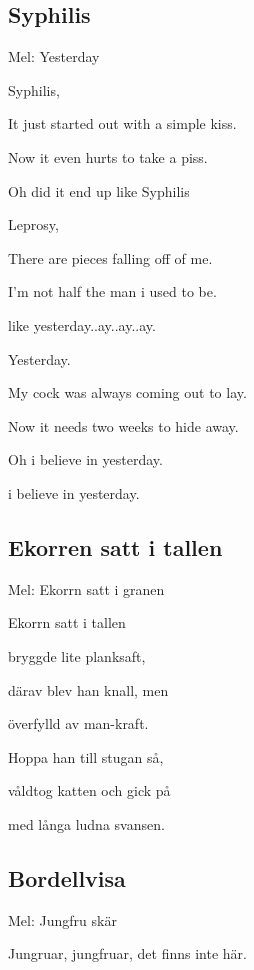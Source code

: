 

\pagestyle{Barnförbjudet}



\subsection{\textbf{Syphilis}}

Mel: Yesterday\bigskip

Syphilis,

It just started out with a simple kiss.

Now it even hurts to take a piss.

Oh did it end up like Syphilis\bigskip

Leprosy,

There are pieces falling off of me.

I'm not half the man i used to be.

like yesterday..ay..ay..ay.\bigskip

Yesterday.

My cock was always coming out to lay.

Now it needs two weeks to hide away.

Oh i believe in yesterday.

i believe in yesterday.

\subsection{\textbf{Ekorren satt i tallen}} 

Mel: Ekorrn satt i granen\bigskip

Ekorrn satt i tallen

bryggde lite planksaft,

därav blev han knall, men

överfylld av man-kraft.

Hoppa han till stugan så, 

våldtog katten och gick på

med långa ludna svansen.

\subsection{\textbf{Bordellvisa}}

Mel: Jungfru skär\bigskip

Jungruar, jungfruar, det finns inte här.

